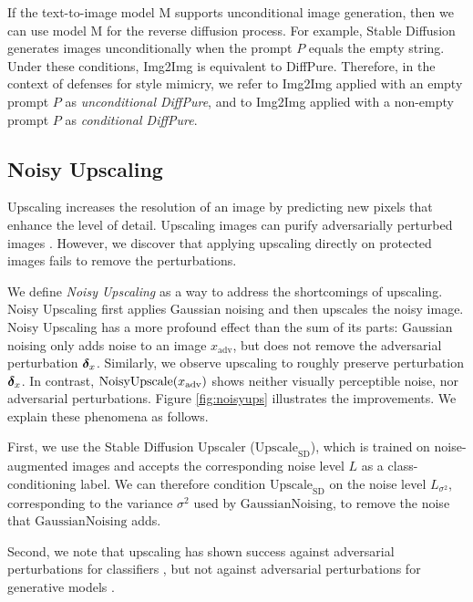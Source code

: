 \documentclass{article}
\newcommand{\model}[1]{\mathrm{#1}}
\newcommand{\advimg}[0]{x_{\textrm{adv}}}
\begin{document}
If the text-to-image model $\model{M}$ supports unconditional image generation,
then we can use model $\model{M}$ for the reverse diffusion process. For example, Stable Diffusion \citep{stablediffusion} generates images unconditionally
when the prompt $P$ equals the empty string. Under these conditions, Img2Img is equivalent to DiffPure. Therefore, in the context of defenses for style mimicry,
we refer to Img2Img applied with an empty prompt $P$ as \textit{unconditional DiffPure}, and to Img2Img applied with a non-empty prompt $P$ as \textit{conditional DiffPure}.




\subsection{Noisy Upscaling}
\label{sec:noisyupscaling}

Upscaling increases the resolution of an image by predicting new pixels that enhance the level of detail. Upscaling images can purify adversarially perturbed images \citep{advupscale}. However, we discover that applying upscaling directly on protected images fails to remove the perturbations. 

We define \textit{Noisy Upscaling} as a way to address the shortcomings of upscaling. Noisy Upscaling
first applies Gaussian noising and then upscales the noisy image.
Noisy Upscaling has a more profound effect than the sum of its parts: Gaussian noising only adds noise
to an image $\advimg$, but does not remove the adversarial perturbation ${\bm{\delta}}_x$. Similarly, we observe upscaling to roughly preserve perturbation ${\bm{\delta}}_x$. In contrast, $\f{\mathrm{NoisyUpscale}}{\advimg}$ shows neither visually perceptible noise, nor adversarial perturbations. Figure \ref{fig:noisyups} illustrates the improvements. We explain these phenomena as follows.

First, we use the Stable Diffusion Upscaler ($\mathrm{Upscale}_{\text{SD}}$), which is trained on noise-augmented images and accepts the corresponding noise level $L$ as a class-conditioning label. We can therefore condition $\mathrm{Upscale}_{\text{SD}}$ on the noise level $L_{\sigma^2}$, corresponding to the variance $\sigma^2$ used by $\mathrm{GaussianNoising}$, to remove the noise that $\mathrm{GaussianNoising}$ adds.

Second, we note that upscaling has shown success against adversarial perturbations for classifiers \citep{advupscale}, but not against adversarial perturbations for generative models \citep{mist, glaze}. 
\end{document}
